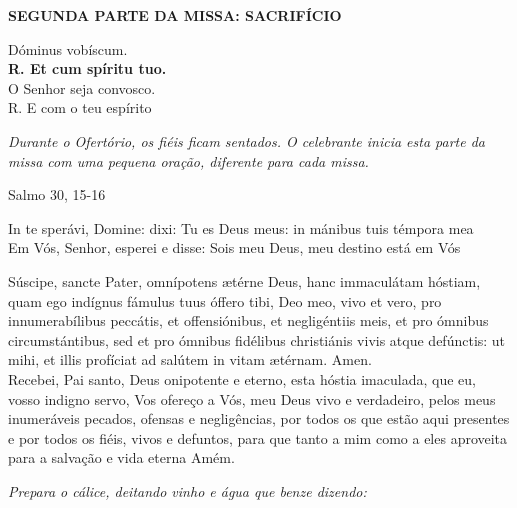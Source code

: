 \begin{center}
	\textbf{SEGUNDA PARTE DA MISSA: SACRIFÍCIO}
\end{center}

\begin{multicols}{2}
	\noindent Dóminus vobíscum.
	\\ \textbf{R. Et cum spíritu tuo.}
	\\O Senhor seja convosco.
	\\R. E com o teu espírito
\end{multicols}

\begin{flushleft}
	\textit{Durante o Ofertório, os fiéis ficam sentados. O celebrante inicia esta parte da missa com uma pequena oração, diferente para cada missa.}
\end{flushleft}

\begin{center}
	Salmo 30, 15-16
\end{center}
\begin{multicols}{2}
	\noindent In te sperávi, Domine: dixi: Tu es Deus meus: in mánibus tuis témpora mea 
	\\ Em Vós, Senhor, esperei e disse: Sois meu Deus, meu destino está em Vós 
\end{multicols}


\begin{multicols}{2}
	\noindent Súscipe, sancte Pater, omnípotens ætérne Deus, hanc immaculátam hóstiam, quam ego indígnus fámulus tuus óffero tibi, Deo meo, vivo et vero, pro innumerabílibus peccátis, et offensiónibus, et negligéntiis meis, et pro ómnibus circumstántibus, sed et pro ómnibus fidélibus christiánis vivis atque defúnctis: ut mihi, et illis profíciat ad salútem in vitam ætérnam. Amen. 
	\\Recebei, Pai santo, Deus onipotente e eterno, esta hóstia imaculada, que eu, vosso indigno servo, Vos ofereço a Vós, meu Deus vivo e verdadeiro, pelos meus inumeráveis pecados, ofensas e negligências, por todos os que estão aqui presentes e por todos os fiéis, vivos e defuntos, para que tanto a mim como a eles aproveita para a salvação e vida eterna Amém.
\end{multicols}

\begin{flushleft}
	\textit{Prepara o cálice, deitando vinho e água que benze dizendo:}
\end{flushleft}


